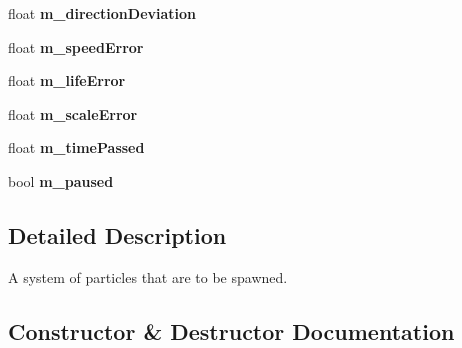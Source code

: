 \begin{DoxyCompactItemize}
\mbox{\label{classflounder_1_1particlesystem_a413f75194acc0a2570fde5750c188f3e}} 
float {\bfseries m\+\_\+direction\+Deviation}
\item 
\mbox{\label{classflounder_1_1particlesystem_a62e977f166839325857cbb078abbfe95}} 
float {\bfseries m\+\_\+speed\+Error}
\item 
\mbox{\label{classflounder_1_1particlesystem_a6e448f77648588a4402931e2a9d7586d}} 
float {\bfseries m\+\_\+life\+Error}
\item 
\mbox{\label{classflounder_1_1particlesystem_ab21f5fa9c7df5d8e8d17d181e01b62c0}} 
float {\bfseries m\+\_\+scale\+Error}
\item 
\mbox{\label{classflounder_1_1particlesystem_a7d80c5af43e48decbf025f1b16f05011}} 
float {\bfseries m\+\_\+time\+Passed}
\item 
\mbox{\label{classflounder_1_1particlesystem_a88b6a1dc993ac46188a8b284d3f3267f}} 
bool {\bfseries m\+\_\+paused}
\end{DoxyCompactItemize}


\subsection{Detailed Description}
A system of particles that are to be spawned. 



\subsection{Constructor \& Destructor Documentation}
\mbox{\label{classflounder_1_1particlesystem_a107ab162ea1911ffd55a0cf06df031e1}} 

